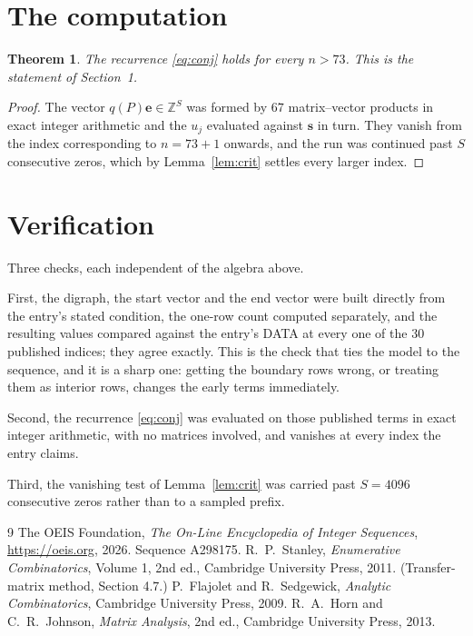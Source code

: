 \documentclass[11pt,a4paper]{article}
\theoremstyle{plain}
\newtheorem{theorem}{Theorem}
\theoremstyle{definition}
\begin{document}
\section{The computation}

\begin{theorem}
The recurrence \eqref{eq:conj} holds for every $n>73$. This is the statement of
Section~1.
\end{theorem}

\begin{proof}
The vector $q(P)\mathbf{e}\in\mathbb{Z}^{S}$ was formed by $67$ matrix--vector
products in exact integer arithmetic and the $u_j$ evaluated against $\mathbf{s}$ in turn.
They vanish from the index corresponding to $n=73+1$ onwards, and the run was continued
past $S$ consecutive zeros, which by Lemma~\ref{lem:crit} settles every larger index.
\end{proof}

\section{Verification}

Three checks, each independent of the algebra above.

First, the digraph, the start vector and the end vector were built directly from the
entry's stated condition, the one-row count computed separately, and the resulting values
compared against the entry's DATA at every one of the $30$ published indices; they
agree exactly. This is the check that ties the model to the sequence, and it is a sharp one:
getting the boundary rows wrong, or treating them as interior rows, changes the early terms
immediately.

Second, the recurrence \eqref{eq:conj} was evaluated on those published terms in exact
integer arithmetic, with no matrices involved, and vanishes at every index the entry claims.

Third, the vanishing test of Lemma~\ref{lem:crit} was carried past $S=4096$ consecutive
zeros rather than to a sampled prefix.

\begin{thebibliography}{9}
 The OEIS Foundation, \emph{The On-Line Encyclopedia of Integer
Sequences}, \url{https://oeis.org}, 2026. Sequence A298175.
 R.~P.~Stanley, \emph{Enumerative Combinatorics}, Volume 1, 2nd ed.,
Cambridge University Press, 2011. (Transfer-matrix method, Section 4.7.)
 P.~Flajolet and R.~Sedgewick, \emph{Analytic Combinatorics}, Cambridge
University Press, 2009.
 R.~A.~Horn and C.~R.~Johnson, \emph{Matrix Analysis}, 2nd ed., Cambridge
University Press, 2013.
\end{thebibliography}
\end{document}
